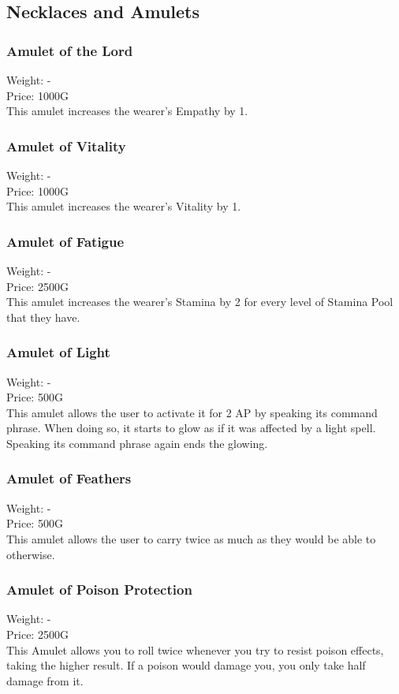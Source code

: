 \subsection{Necklaces and Amulets}

\subsubsection{Amulet of the Lord}
Weight: -\\
Price: 1000G\\
This amulet increases the wearer's Empathy by 1.

\subsubsection{Amulet of Vitality}
Weight: -\\
Price: 1000G\\
This amulet increases the wearer's Vitality by 1.

\subsubsection{Amulet of Fatigue}
Weight: -\\
Price: 2500G\\
This amulet increases the wearer's Stamina by 2 for every level of Stamina Pool that they have.

\subsubsection{Amulet of Light}
Weight: -\\
Price: 500G\\
This amulet allows the user to activate it for 2 AP by speaking its command phrase. When doing so, it starts to glow as if it was affected by a light spell. Speaking its command phrase again ends the glowing.

\subsubsection{Amulet of Feathers}
Weight: -\\
Price: 500G\\
This amulet allows the user to carry twice as much as they would be able to otherwise.

\subsubsection{Amulet of Poison Protection}
Weight: -\\
Price: 2500G\\
This Amulet allows you to roll twice whenever you try to resist poison effects, taking the higher result. If a poison would damage you, you only take half damage from it.